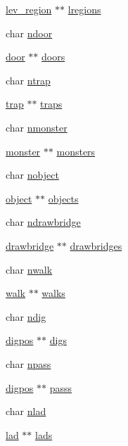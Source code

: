 \begin{DoxyCompactItemize}
\hyperlink{structlev__region}{lev\+\_\+region} $\ast$$\ast$ \hyperlink{structmazepart_a6a10fd5495df1c0a1927f01ef77c37b5}{lregions}
\item 
char \hyperlink{structmazepart_a8a2c8d4078ff76f6d3d250374637c599}{ndoor}
\item 
\hyperlink{structdoor}{door} $\ast$$\ast$ \hyperlink{structmazepart_a7254a28f45dca92b48133fa8d0beb46c}{doors}
\item 
char \hyperlink{structmazepart_ac5d5c8f643ddbdaa4c140a9d9d1e4ac1}{ntrap}
\item 
\hyperlink{structtrap}{trap} $\ast$$\ast$ \hyperlink{structmazepart_a8a5efd939c3ffc35f4413d301f757138}{traps}
\item 
char \hyperlink{structmazepart_a149c4e4689c3764690892f4296ad95c0}{nmonster}
\item 
\hyperlink{structmonster}{monster} $\ast$$\ast$ \hyperlink{structmazepart_af711ec15871a8b9b8cc5222ea5c87591}{monsters}
\item 
char \hyperlink{structmazepart_ade304a786902ad6a462fb3cf1322189d}{nobject}
\item 
\hyperlink{structobject}{object} $\ast$$\ast$ \hyperlink{structmazepart_a7c291d9120d934c18132388c03e2d81e}{objects}
\item 
char \hyperlink{structmazepart_a20189e7cae9f4320ee13d4837a42cf80}{ndrawbridge}
\item 
\hyperlink{structdrawbridge}{drawbridge} $\ast$$\ast$ \hyperlink{structmazepart_a5cbbfc2dfa9f3876990b7008b2051704}{drawbridges}
\item 
char \hyperlink{structmazepart_adbaeae6d140fd6f0e26fcf770724ea43}{nwalk}
\item 
\hyperlink{structwalk}{walk} $\ast$$\ast$ \hyperlink{structmazepart_a45a7f4fecef5ff4bd0ad3bfd87aa641c}{walks}
\item 
char \hyperlink{structmazepart_ac97fe77a6c1e89eb67eb53f43e5017b8}{ndig}
\item 
\hyperlink{structdigpos}{digpos} $\ast$$\ast$ \hyperlink{structmazepart_a0650f683ebb57c5e13363e08e9d2e69e}{digs}
\item 
char \hyperlink{structmazepart_a7726969c512cd8258ec4649c034e44f6}{npass}
\item 
\hyperlink{structdigpos}{digpos} $\ast$$\ast$ \hyperlink{structmazepart_a166291a6c614004ebc26c995ab1b5ac4}{passs}
\item 
char \hyperlink{structmazepart_a3249719f5288fb209a945b9f758653c3}{nlad}
\item 
\hyperlink{structlad}{lad} $\ast$$\ast$ \hyperlink{structmazepart_ad03167489d5683612969d4f7897e318e}{lads}

\end{DoxyCompactItemize}
